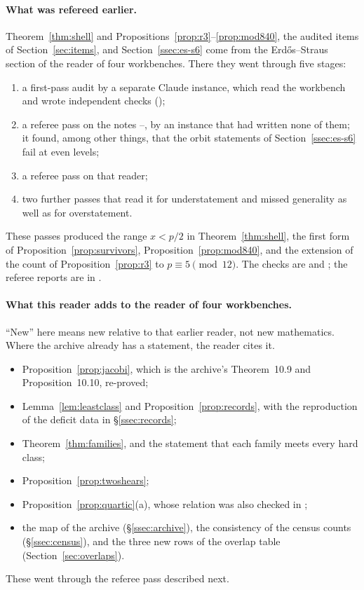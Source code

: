 \paragraph{What was refereed earlier.}
Theorem~\ref{thm:shell} and Propositions~\ref{prop:r3}--\ref{prop:mod840}, the audited items of Section~\ref{sec:items}, and Section~\ref{ssec:es-s6} come from the Erdős--Straus section of the reader of four workbenches. There they went through five stages:
\begin{enumerate}[label=\arabic*.]
\item a first-pass audit by a separate Claude instance, which read the workbench and wrote independent checks ();
\item a referee pass on the notes --, by an instance that had written none of them; it found, among other things, that the orbit statements of Section~\ref{ssec:es-s6} fail at even levels;
\item a referee pass on that reader;
\item two further passes that read it for understatement and missed generality as well as for overstatement.
\end{enumerate}
These passes produced the range $x<p/2$ in Theorem~\ref{thm:shell}, the first form of Proposition~\ref{prop:survivors}, Proposition~\ref{prop:mod840}, and the extension of the count of Proposition~\ref{prop:r3} to $p\equiv5\pmod{12}$. The checks are  and ; the referee reports are in .

\paragraph{What this reader adds to the reader of four workbenches.}
``New'' here means new relative to that earlier reader, not new mathematics. Where the archive already has a statement, the reader cites it.
\begin{itemize}
\item Proposition~\ref{prop:jacobi}, which is the archive's Theorem~10.9 and Proposition~10.10, re-proved;
\item Lemma~\ref{lem:leastclass} and Proposition~\ref{prop:records}, with the reproduction of the deficit data in §\ref{ssec:records};
\item Theorem~\ref{thm:families}, and the statement that each family meets every hard class;
\item Proposition~\ref{prop:twoshears};
\item Proposition~\ref{prop:quartic}(a), whose relation was also checked in ;
\item the map of the archive (§\ref{ssec:archive}), the consistency of the census counts (§\ref{ssec:census}), and the three new rows of the overlap table (Section~\ref{sec:overlaps}).
\end{itemize}
These went through the referee pass described next.

